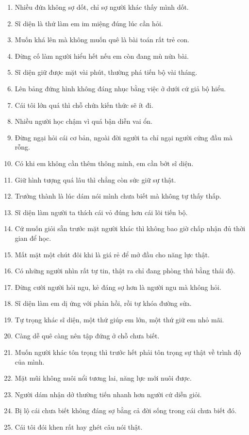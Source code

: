 \begin{enumerate}[leftmargin=*,resume]
\item Nhiều đứa không sợ dốt, chỉ sợ người khác thấy mình dốt.
\item Sĩ diện là thứ làm em im miệng đúng lúc cần hỏi.
\item Muốn khá lên mà không muốn quê là bài toán rất trẻ con.
\item Đừng cố làm người hiểu hết nếu em còn đang mù nửa bài.
\item Sĩ diện giữ được mặt vài phút, thường phá tiến bộ vài tháng.
\item Lên bảng đứng hình không đáng nhục bằng việc ở dưới cứ giả bộ hiểu.
\item Cái tôi lớn quá thì chỗ chứa kiến thức sẽ ít đi.
\item Nhiều người học chậm vì quá bận diễn vai ổn.
\item Đừng ngại hỏi cái cơ bản, ngoài đời người ta chỉ ngại người cứng đầu mà rỗng.
\item Có khi em không cần thêm thông minh, em cần bớt sĩ diện.
\item Giữ hình tượng quá lâu thì chẳng còn sức giữ sự thật.
\item Trưởng thành là lúc dám nói mình chưa biết mà không tự thấy thấp.
\item Sĩ diện làm người ta thích cái vỏ đúng hơn cái lõi tiến bộ.
\item Cứ muốn giỏi sẵn trước mặt người khác thì không bao giờ chấp nhận đủ thời gian để học.
\item Mất mặt một chút đôi khi là giá rẻ để mở đầu cho năng lực thật.
\item Có những người nhìn rất tự tin, thật ra chỉ đang phòng thủ bằng thái độ.
\item Đừng cười người hỏi ngu, kẻ đáng sợ hơn là người ngu mà không hỏi.
\item Sĩ diện làm em dị ứng với phản hồi, rồi tự khóa đường sửa.
\item Tự trọng khác sĩ diện, một thứ giúp em lớn, một thứ giữ em nhỏ mãi.
\item Càng dễ quê càng nên tập đứng ở chỗ chưa biết.
\item Muốn người khác tôn trọng thì trước hết phải tôn trọng sự thật về trình độ của mình.
\item Mặt mũi không nuôi nổi tương lai, năng lực mới nuôi được.
\item Người dám nhận dở thường tiến nhanh hơn người cứ diễn giỏi.
\item Bị lộ cái chưa biết không đáng sợ bằng cả đời sống trong cái chưa biết đó.
\item Cái tôi đói khen rất hay ghét câu nói thật.
\end{enumerate}


